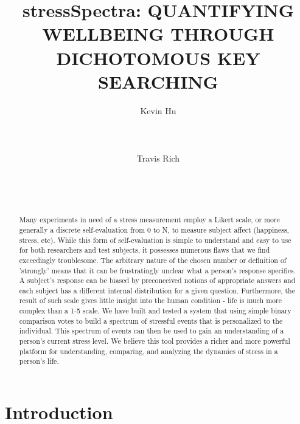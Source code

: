\documentclass{sigchi}
\begin{document}
\title{stressSpectra: QUANTIFYING WELLBEING THROUGH DICHOTOMOUS KEY SEARCHING }

\author{
  \alignauthor Kevin Hu\\
    \\
    \\
    \\
  \alignauthor Travis Rich\\
    \\
    \\
    \\
}

\maketitle

\begin{abstract}
Many experiments in need of a stress measurement employ a Likert scale, or more generally a discrete self-evaluation from 0 to N, to measure subject affect (happiness, stress, etc). While this form of self-evaluation is simple to understand and easy to use for both researchers and test subjects, it possesses numerous flaws that we find exceedingly troublesome. The arbitrary nature of the chosen number or definition of 'strongly' means that it can be frustratingly unclear what a person's response specifies. A subject's response can be biased by preconceived notions of appropriate answers and each subject has a different internal distribution for a given question. Furthermore, the result of such scale gives little insight into the human condition - life is much more complex than a 1-5 scale. We have built and tested a system that using simple binary comparison votes to build a spectrum of stressful events that is personalized to the individual. This spectrum of events can then be used to gain an understanding of a person's current stress level. We believe this tool provides a richer and more powerful platform for understanding, comparing, and analyzing the dynamics of stress in a person's life. 
\end{abstract}


\section{Introduction}
\end{document}
